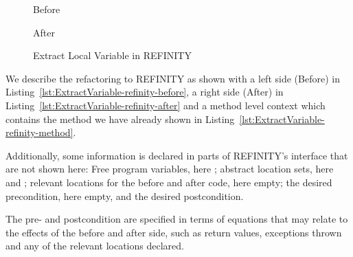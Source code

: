 \begin{figure}[tbp]
  \captionsetup{type=lstlisting}
  \centering
  \begin{sublstlisting}[b]{.34\linewidth}
    
    \vspace{-2mm}
    \caption{Before}
    \label{lst:ExtractVariable-refinity-before}
  \end{sublstlisting}\hspace{1cm}
  \begin{sublstlisting}[b]{.34\linewidth}
    
    \vspace{-2mm}
    \caption{After}
    \label{lst:ExtractVariable-refinity-after}
  \end{sublstlisting}
\caption{Extract Local Variable in REFINITY}
\label{lst:ExtractVariable-refinity}
\end{figure}

We describe the refactoring to REFINITY as shown with a left side (Before) in Listing~\ref{lst:ExtractVariable-refinity-before},
a right side (After) in Listing~\ref{lst:ExtractVariable-refinity-after} and a method level context which contains the method we have already shown in Listing~\ref{lst:ExtractVariable-refinity-method}.

Additionally, some information is declared in parts of REFINITY's interface that are not shown here:
Free program variables, here ; abstract location sets, here  and ; relevant locations for the before and after code, here empty;
the desired precondition, here empty, and the desired postcondition.

The pre- and postcondition are specified in terms of equations that may relate to the effects of the before and after side, such as return values, exceptions thrown and any of the relevant locations declared.

